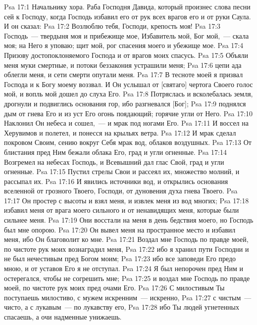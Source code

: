 \vs Psa 17:1 Начальнику хора. Раба Господня Давида, который произнес слова песни сей к Господу, когда Господь избавил его от рук всех врагов его и от руки Саула. И он сказал:
\rsbpar\vs Psa 17:2 Возлюблю тебя, Господи, крепость моя!
\vs Psa 17:3 Господь~--- твердыня моя и прибежище мое, Избавитель мой, Бог мой,~--- скала моя; на Него я уповаю; щит мой, рог спасения моего и убежище мое.
\vs Psa 17:4 Призову достопоклоняемого Господа и от врагов моих спасусь.
\vs Psa 17:5 Объяли меня муки смертные, и потоки беззакония устрашили меня;
\vs Psa 17:6 цепи ада облегли меня, и сети смерти опутали меня.
\vs Psa 17:7 В тесноте моей я призвал Господа и к Богу моему воззвал. И Он услышал от [святаго] чертога Своего голос мой, и вопль мой дошел до слуха Его.
\vs Psa 17:8 Потряслась и всколебалась земля, дрогнули и подвиглись основания гор, ибо разгневался [Бог];
\vs Psa 17:9 поднялся дым от гнева Его и из уст Его огонь поядающий; горячие угли  от Него.
\vs Psa 17:10 Наклонил Он небеса и сошел,~--- и мрак под ногами Его.
\vs Psa 17:11 И воссел на Херувимов и полетел, и понесся на крыльях ветра.
\vs Psa 17:12 И мрак сделал покровом Своим, сению вокруг Себя мрак вод, облаков воздушных.
\vs Psa 17:13 От блистания пред Ним бежали облака Его, град и угли огненные.
\vs Psa 17:14 Возгремел на небесах Господь, и Всевышний дал глас Свой, град и угли огненные.
\vs Psa 17:15 Пустил стрелы Свои и рассеял их, множество молний, и рассыпал их.
\vs Psa 17:16 И явились источники вод, и открылись основания вселенной от грозного  Твоего, Господи, от дуновения духа гнева Твоего.
\vs Psa 17:17 Он простер  с высоты и взял меня, и извлек меня из вод многих;
\vs Psa 17:18 избавил меня от врага моего сильного и от ненавидящих меня, которые были сильнее меня.
\vs Psa 17:19 Они восстали на меня в день бедствия моего, но Господь был мне опорою.
\vs Psa 17:20 Он вывел меня на пространное место и избавил меня, ибо Он благоволит ко мне.
\vs Psa 17:21 Воздал мне Господь по правде моей, по чистоте рук моих вознаградил меня,
\vs Psa 17:22 ибо я хранил пути Господни и не был нечестивым пред Богом моим;
\vs Psa 17:23 ибо все заповеди Его предо мною, и от уставов Его я не отступал.
\vs Psa 17:24 Я был непорочен пред Ним и остерегался, чтобы не согрешить мне;
\vs Psa 17:25 и воздал мне Господь по правде моей, по чистоте рук моих пред очами Его.
\vs Psa 17:26 С милостивым Ты поступаешь милостиво, с мужем искренним~--- искренно,
\vs Psa 17:27 с чистым~--- чисто, а с лукавым~--- по лукавству его,
\vs Psa 17:28 ибо Ты людей угнетенных спасаешь, а очи надменные унижаешь.
